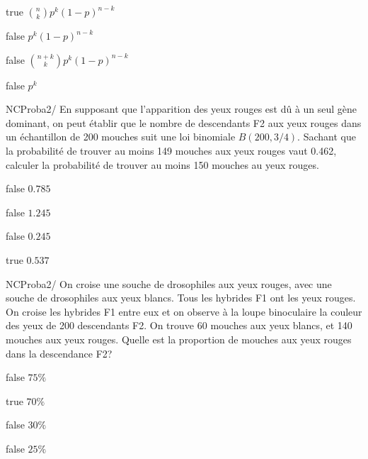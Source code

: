 \documentclass[11pt]{article}
\begin{document}
            \begin{reponses}
            	\item[true]   $ \binom{n}{k}p^{k}(1-p)^{n-k}$
            	\item[false]  $  p^{k}(1-p)^{n-k}$
                \item[false]  $  \binom{n+k}{k}p^{k}(1-p)^{n-k}$
                \item[false]  $  p^{k}$
            \end{reponses}
            
            
            \begin{question}{NC}{Proba}{2}{/} 
 				En supposant que l'apparition des yeux rouges est dû à un seul gène dominant, on peut établir que le nombre de descendants F2 aux yeux rouges dans un échantillon de 200 mouches suit une loi binomiale $B(200,3/4)$. Sachant que la probabilité de trouver au moins 149 mouches aux yeux rouges vaut 0.462, calculer la probabilité de trouver au moins 150 mouches au yeux rouges.
            \end{question}

            \begin{reponses}
            	\item[false] $0.785$
            	\item[false] $1.245$
                \item[false] $0.245$
                \item[true]  $0.537$
            \end{reponses}
            
            
             \begin{question}{NC}{Proba}{2}{/} 
 				On croise une souche de drosophiles aux yeux rouges, avec une souche de drosophiles aux yeux blancs. Tous les hybrides F1 ont les yeux rouges. On croise les hybrides F1 entre eux et on observe à la loupe binoculaire la couleur des yeux de 200 descendants F2. On trouve 60 mouches aux yeux blancs, et 140 mouches aux yeux rouges. Quelle est la proportion de mouches aux yeux rouges dans la descendance F2?
            \end{question}

            \begin{reponses}
            	\item[false]  $75\%$
            	\item[true]   $70\%$
                \item[false]  $30\%$
                \item[false]  $25\%$
            \end{reponses}
			
\end{document}
